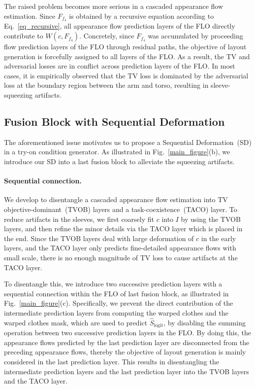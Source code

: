 \documentclass[letterpaper]{article} %
\begin{document}
The raised problem becomes more serious in a cascaded appearance flow estimation.
Since $F_{f_4}$ is obtained by a recursive equation according to Eq.~\ref{eq_recursive}, all appearance flow prediction layers of the FLO directly contribute to $W(c,F_{f_4})$.
Concretely, since $F_{f_4}$ was accumulated by proceeding flow prediction layers of the FLO through residual paths, the objective of layout generation is forcefully assigned to all layers of the FLO.
As a result, the TV and adversarial losses are in conflict across prediction layers of the FLO.
In most cases, it is empirically observed that the TV loss is dominated by the adversarial loss at the boundary region between the arm and torso, resulting in sleeve-squeezing artifacts.

\subsection{Fusion Block with Sequential Deformation}
The aforementioned issue motivates us to propose a Sequential Deformation~(SD) in a try-on condition generator.
As illustrated in Fig.~\ref{main_figure}(b), we introduce our SD into a last fusion block to alleviate the squeezing artifacts.

\paragraph{Sequential connection.}
We develop to disentangle a cascaded appearance flow estimation into TV objective-dominant~(TVOB) layers and a task-coexistence~(TACO) layer.
To reduce artifacts in the sleeves, we first coarsely fit $c$ into $I$ by using the TVOB layers, and then refine the minor details via the TACO layer which is placed in the end.
Since the TVOB layers deal with large deformation of $c$ in the early layers, and the TACO layer only predicts fine-detailed appearance flows with small scale, there is no enough magnitude of TV loss to cause artifacts at the TACO layer.

To disentangle this, we introduce two successive prediction layers with a sequential connection within the FLO of last fusion block, as illustrated in Fig.~\ref{main_figure}(c).
Specifically, we prevent the direct contribution of the intermediate prediction layers from computing the warped clothes and the warped clothes mask, which are used to predict $\hat{S}_{\text{logit}}$, by disabling the summing operation between two successive prediction layers in the FLO.
By doing this, the appearance flows predicted by the last prediction layer are disconnected from the preceding appearance flows, thereby the objective of layout generation is mainly considered in the last prediction layer.
This results in disentangling the intermediate prediction layers and the last prediction layer into the TVOB layers and the TACO layer.
\end{document}
